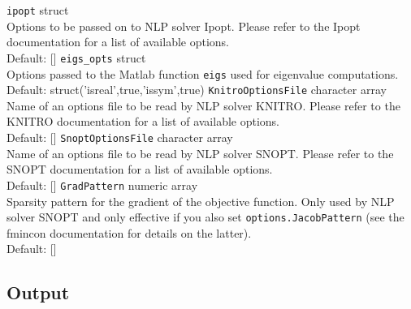 \documentclass{article}
\begin{document}
\noindent
\texttt{ipopt} \hskip 2.7cm     struct   \\
Options to be passed on to NLP solver Ipopt. Please refer to the Ipopt documentation for a
list of available options. \\
Default: []
\vskip 2mm
\noindent
\texttt{eigs\_opts} \hskip 2.1cm       struct    \\
Options passed to the Matlab function \texttt{eigs} used for eigenvalue computations. \\
Default: struct('isreal',true,'issym',true)
\vskip 2mm
\noindent
\texttt{KnitroOptionsFile} \hskip 0.5cm  character array \\
Name of an options file to be read by NLP solver KNITRO. Please refer to the KNITRO
documentation for a list of available options.\\
Default: []
\vskip 2mm
\noindent
\texttt{SnoptOptionsFile} \hskip 0.6cm   character array \\
Name of an options file to be read by NLP solver SNOPT. Please refer to the SNOPT
documentation for a list of available options.\\
Default: []
\vskip 2mm
\noindent
\texttt{GradPattern} \hskip 1.5cm        numeric array   \\
Sparsity pattern for the gradient of the objective function. Only used by NLP solver SNOPT and 
only effective if you also set \texttt{options.JacobPattern} (see the fmincon documentation for
details on the latter). \\
Default: []



\subsection{Output}
\end{document}
